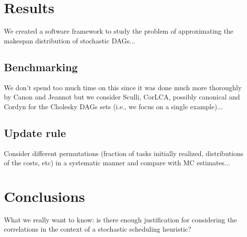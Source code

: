 \documentclass[12pt]{article}
\begin{document}
\section{Results}
\label{sect.results}


We created a software framework to study the problem of approximating the makespan distribution of stochastic DAGs...

\subsection{Benchmarking}
\label{subsect.benchmarking}

We don't spend too much time on this since it was done much more thoroughly by Canon and Jeannot but we consider Sculli, CorLCA, possibly canonical and Cordyn for the Cholesky DAGs sets (i.e., we focus on a single example)...

\subsection{Update rule}
\label{subsect.results_update_rule}

Consider different permutations (fraction of tasks initially realized, distributions of the costs, etc) in a systematic manner and compare with MC estimates... 

\section{Conclusions}
\label{sect.conclusions}

What we really want to know: is there enough justification for considering the correlations in the context of a stochastic scheduling heuristic? 



\end{document}
